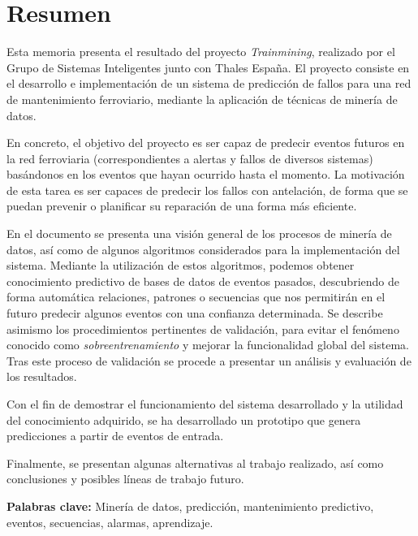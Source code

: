 \chapter*{Resumen}


Esta memoria presenta el resultado del proyecto \emph{Trainmining}, realizado por el Grupo de Sistemas Inteligentes junto con Thales España. El proyecto consiste en el desarrollo e implementación de un sistema
de predicción de fallos para una red de mantenimiento ferroviario, mediante la aplicación de técnicas de minería de datos.

En concreto, el objetivo del proyecto es ser capaz de predecir eventos futuros en la red ferroviaria (correspondientes a alertas y fallos de diversos sistemas) basándonos en los eventos que hayan ocurrido hasta el momento. La motivación de esta tarea es ser capaces de predecir los fallos con antelación, de forma que se puedan prevenir o planificar su reparación de una forma más eficiente.

En el documento se presenta una visión general de los procesos de minería de datos, así como de algunos algoritmos considerados para la implementación del sistema. Mediante la utilización de estos algoritmos, podemos obtener conocimiento predictivo de bases de datos de eventos pasados, descubriendo de forma automática relaciones, patrones o secuencias que nos permitirán en el futuro predecir algunos eventos con una confianza determinada. Se describe asimismo los procedimientos pertinentes de validación, para evitar el fenómeno conocido como \emph{sobreentrenamiento} y mejorar la funcionalidad global del sistema. Tras este proceso de validación se procede a presentar un análisis y evaluación de los resultados.

Con el fin de demostrar el funcionamiento del sistema desarrollado y la utilidad del conocimiento adquirido, se ha desarrollado un prototipo que genera predicciones a partir de eventos de entrada.

Finalmente, se presentan algunas alternativas al trabajo realizado, así como conclusiones y posibles líneas de trabajo futuro.

\vfill
\textbf{Palabras clave:} Minería de datos, predicción, mantenimiento predictivo, eventos, secuencias, alarmas, aprendizaje.

